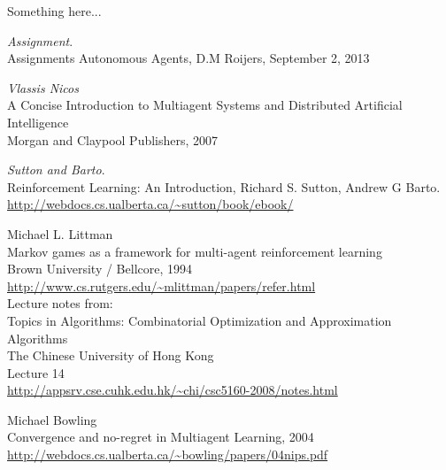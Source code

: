\documentclass[a4paper,12pt]{article}
\begin{document}
Something here...

\thebibliography{}
  \emph{Assignment}.\\
  Assignments Autonomous Agents, D.M Roijers, September 2, 2013

	\emph{Vlassis Nicos} \\
	A Concise Introduction to Multiagent Systems and Distributed Artificial Intelligence \\
	Morgan and Claypool Publishers, 2007 
	
  \emph{Sutton and Barto}.\\
  Reinforcement Learning: An Introduction, Richard S. Sutton, Andrew G Barto. \\
  \url{http://webdocs.cs.ualberta.ca/~sutton/book/ebook/}
 
 Michael L. Littman \\
 Markov games as a framework for multi-agent reinforcement learning \\
 Brown University / Bellcore, 1994 \\
 \url{http://www.cs.rutgers.edu/~mlittman/papers/refer.html} \\
 
 Lecture notes from: \\ 
 Topics in Algorithms: Combinatorial Optimization and Approximation Algorithms \\
 The Chinese University of Hong Kong \\
 Lecture 14 \\
 \url{http://appsrv.cse.cuhk.edu.hk/~chi/csc5160-2008/notes.html}
 
 Michael Bowling \\
 Convergence and no-regret in Multiagent Learning, 2004 \\
 \url{http://webdocs.cs.ualberta.ca/~bowling/papers/04nips.pdf}

\end{document}
